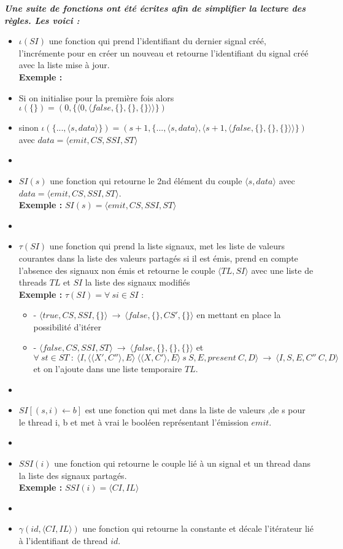 \documentclass[10pt,a4paper]{article}
\begin{document}
				
				\textbf{\textit{Une suite de fonctions ont été écrites afin de simplifier la lecture des règles. Les voici :}}
				\smallbreak
				\begin{itemize}
					\item[] $\iota(SI)$ une fonction qui prend l'identifiant du dernier signal créé, l'incrémente pour en créer un nouveau et retourne l'identifiant du signal créé avec la liste mise à jour.
					\\ \textbf{Exemple :} 
					\item[] Si on initialise pour la première fois alors $\iota(\{\}) = (0 ,\{\langle 0,\langle false,\{\},\{\},\{\}\rangle\rangle\})$
					\item[] sinon $\iota(\{...,\langle s,data\rangle\}) = (s+1 ,\{...,\langle s,data\rangle,\langle s+1,\langle false,\{\},\{\},\{\}\rangle\rangle\})$ avec $data = \langle emit,CS,SSI,ST\rangle$
					\item[] 
					\item[] $SI(s)$ une fonction qui retourne le 2nd élément du couple $\langle s,data\rangle$ avec $data = \langle emit,CS,SSI,ST\rangle$.
					\\\textbf{Exemple :} $SI(s) = \langle emit,CS,SSI,ST\rangle$
					\item[]  
					\item[] $\tau(SI)$ une fonction qui prend la liste signaux, met les liste de valeurs courantes dans la liste des valeurs partagés si il est émis, prend en compte l'absence des signaux non émis et retourne le couple $\langle TL,SI \rangle$ avec une liste de threads $TL$ et $SI$ la liste des signaux modifiés 
					\\ \textbf{Exemple :} $\tau(SI) = \forall~si \in SI$ : 
					\begin{itemize}
						\item[] - $\langle true,CS,SSI,\{\}\rangle~\rightarrow~\langle false,\{\},CS',\{\}\rangle$ en mettant en place la possibilité d'itérer
						\item[] - $\langle false,CS,SSI,ST\rangle~\rightarrow~\langle false,\{\},\{\},\{\}\rangle$ et 
						\\$\forall~st \in ST~:~\langle I,\langle\langle X',C''\rangle, E\rangle~\langle\langle X,C'\rangle, E\rangle~s~S,E,present~C,D\rangle~\rightarrow~\langle I,S,E,C''~C,D\rangle$ et on l'ajoute dans une liste temporaire $TL$.
					\end{itemize}
					\item[]
					\item[] $SI[(s,i) \leftarrow b]$ est une fonction qui met dans la liste de valeurs ,de s pour le thread i, b et met à vrai le booléen représentant l'émission $emit$.
					\item[] 
					\item[] $SSI(i)$ une fonction qui retourne le couple lié à un signal et un thread dans la liste des signaux partagés.
					\\ \textbf{Exemple :} $SSI(i) = \langle CI,IL\rangle$
					\item[] 
					\item[] $\gamma(id,\langle CI,IL\rangle)$ une fonction qui retourne la constante et décale l'itérateur lié à l'identifiant de thread $id$.
				\end{itemize}
\end{document}
